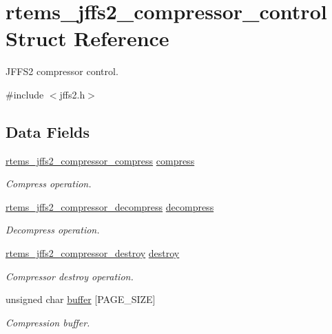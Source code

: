 \hypertarget{structrtems__jffs2__compressor__control}{}\section{rtems\+\_\+jffs2\+\_\+compressor\+\_\+control Struct Reference}
\label{structrtems__jffs2__compressor__control}


J\+F\+F\+S2 compressor control.  




{\ttfamily \#include $<$jffs2.\+h$>$}

\subsection*{Data Fields}
\begin{DoxyCompactItemize}
\item 
\mbox{\label{structrtems__jffs2__compressor__control_a21416a969e3e5674cdd7bd08fc8f552a}} 
\mbox{\hyperlink{group__JFFS2_ga38bf7fa8284a6ebf3db7df30916b266f}{rtems\+\_\+jffs2\+\_\+compressor\+\_\+compress}} \mbox{\hyperlink{structrtems__jffs2__compressor__control_a21416a969e3e5674cdd7bd08fc8f552a}{compress}}
\begin{DoxyCompactList}\small\item\em Compress operation. \end{DoxyCompactList}\item 
\mbox{\label{structrtems__jffs2__compressor__control_ab94c8edd80adca87821a61a0c95a1c10}} 
\mbox{\hyperlink{group__JFFS2_gac59895fce451303d0b8c0851acbfa353}{rtems\+\_\+jffs2\+\_\+compressor\+\_\+decompress}} \mbox{\hyperlink{structrtems__jffs2__compressor__control_ab94c8edd80adca87821a61a0c95a1c10}{decompress}}
\begin{DoxyCompactList}\small\item\em Decompress operation. \end{DoxyCompactList}\item 
\mbox{\hyperlink{group__JFFS2_ga728f7d3454f5621b992c0c40447ae0a3}{rtems\+\_\+jffs2\+\_\+compressor\+\_\+destroy}} \mbox{\hyperlink{structrtems__jffs2__compressor__control_a41708878229606f5220e18baf582aa59}{destroy}}
\begin{DoxyCompactList}\small\item\em Compressor destroy operation. \end{DoxyCompactList}\item 
\mbox{\label{structrtems__jffs2__compressor__control_aacb51ba4fe32bb170db09c18cd0e54bf}} 
unsigned char \mbox{\hyperlink{structrtems__jffs2__compressor__control_aacb51ba4fe32bb170db09c18cd0e54bf}{buffer}} \mbox{[}P\+A\+G\+E\+\_\+\+S\+I\+ZE\mbox{]}
\begin{DoxyCompactList}\small\item\em Compression buffer. \end{DoxyCompactList}\end{DoxyCompactItemize}


